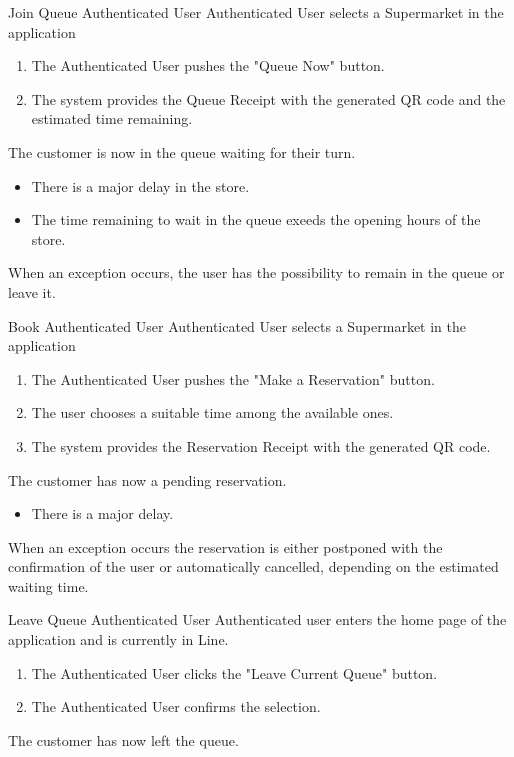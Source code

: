 \usecase
{Join Queue}
{Authenticated User}
{Authenticated User selects a Supermarket in the application}
{
        \begin{enumerate}
            \item The Authenticated User pushes the "Queue Now" button.
            \item The system provides the Queue Receipt with the generated QR code and the estimated time remaining.
        \end{enumerate}
}
{
    The customer is now in the queue waiting for their turn.
}
{
    \begin{itemize}
        \item There is a major delay in the store. 
        \item The time remaining to wait in the queue exeeds the opening hours of the store. 
    \end{itemize}
}
{
    When an exception occurs, the user has the possibility to remain in the queue or leave it. 
}


\usecase
{Book}
{Authenticated User}
{Authenticated User selects a Supermarket in the application}
{
        \begin{enumerate}
            \item The Authenticated User pushes the "Make a Reservation" button.
            \item The user chooses a suitable time among the available ones. 
            \item The system provides the Reservation Receipt with the generated QR code.
        \end{enumerate}
}
{
    The customer has now a pending reservation.
}
{
    \begin{itemize}
        \item There is a major delay.
    \end{itemize}
}
{
    When an exception occurs the reservation is either postponed with the confirmation of the user or automatically cancelled, depending on the estimated waiting time. 
}


\usecase
{Leave Queue}
{Authenticated User}
{Authenticated user enters the home page of the application and is currently in Line.}
{
    \begin{enumerate}
        \item The Authenticated User clicks the "Leave Current Queue" button.
        \item The Authenticated User confirms the selection.
    \end{enumerate}
}
{
    The customer has now left the queue.
}
{}
{}

